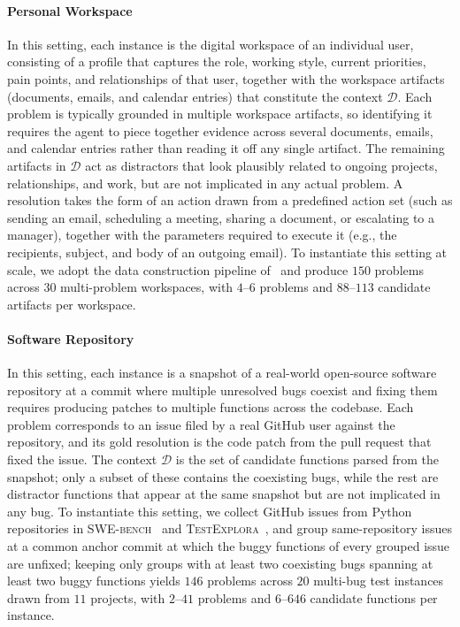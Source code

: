 \documentclass{llmxive}
\begin{document}
\paragraph{Personal Workspace}
In this setting, each instance is the digital workspace of an individual user, consisting of a profile that captures the role, working style, current priorities, pain points, and relationships of that user, together with the workspace artifacts (documents, emails, and calendar entries) that constitute the context $\mathcal{D}$. Each problem is typically grounded in multiple workspace artifacts, so identifying it requires the agent to piece together evidence across several documents, emails, and calendar entries rather than reading it off any single artifact. The remaining artifacts in $\mathcal{D}$ act as distractors that look plausibly related to ongoing projects, relationships, and work, but are not implicated in any actual problem. A resolution takes the form of an action drawn from a predefined action set (such as sending an email, scheduling a meeting, sharing a document, or escalating to a manager), together with the parameters required to execute it (e.g., the recipients, subject, and body of an outgoing email). To instantiate this setting at scale, we adopt the data construction pipeline of~\citet{probe} and produce $150$ problems across $30$ multi-problem workspaces, with $4$--$6$ problems and $88$--$113$ candidate artifacts per workspace.

\paragraph{Software Repository}
In this setting, each instance is a snapshot of a real-world open-source software repository at a commit where multiple unresolved bugs coexist and fixing them requires producing patches to multiple functions across the codebase. Each problem corresponds to an issue filed by a real GitHub user against the repository, and its gold resolution is the code patch from the pull request that fixed the issue. The context $\mathcal{D}$ is the set of candidate functions parsed from the snapshot; only a subset of these contains the coexisting bugs, while the rest are distractor functions that appear at the same snapshot but are not implicated in any bug. To instantiate this setting, we collect GitHub issues from Python repositories in \textsc{SWE-bench}~\cite{SWE-bench} and \textsc{TestExplora}~\cite{TestExplora}, and group same-repository issues at a common anchor commit at which the buggy functions of every grouped issue are unfixed; keeping only groups with at least two coexisting bugs spanning at least two buggy functions yields $146$ problems across $20$ multi-bug test instances drawn from $11$ projects, with $2$--$41$ problems and $6$--$646$ candidate functions per instance.
\end{document}
